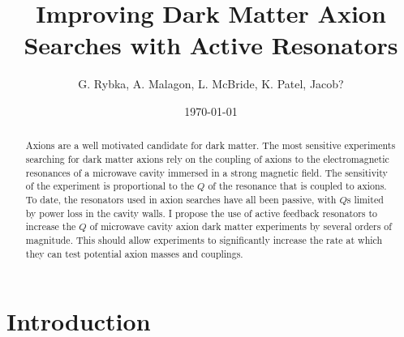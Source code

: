 \documentclass[aps,prl,twocolumn,groupedaddress]{revtex4-1}
\begin{document}
\title{Improving Dark Matter Axion Searches with Active Resonators}
\author{G. Rybka, A. Malagon, L. McBride, K. Patel, Jacob?}
\date{}                                           %

%

\date{\today}

\begin{abstract}
Axions are a well motivated candidate for dark matter.  The most sensitive experiments searching for dark matter axions rely on the coupling of axions to the electromagnetic resonances of a microwave cavity immersed in a strong magnetic field.  The sensitivity of the experiment is proportional to the $Q$ of the resonance that is coupled to axions.
To date, the resonators used in axion searches have all been passive, with $Q$s limited by power loss in the cavity walls.  I propose the use of active feedback resonators to increase the $Q$ of microwave cavity axion dark matter experiments by several orders of magnitude.
This should allow experiments to significantly increase the rate at which they can test potential axion masses and couplings.
\end{abstract}

\pacs{}

\maketitle

\section{Introduction} 
\end{document}

